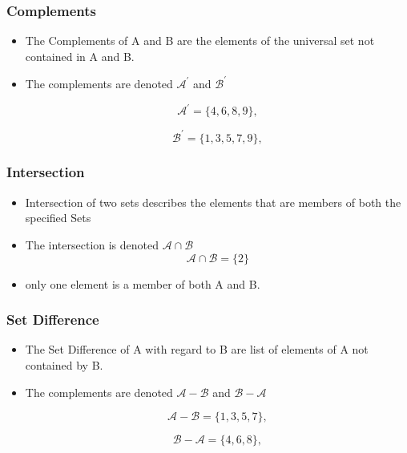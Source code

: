 \subsubsection*{Complements}

\begin{itemize}


\item The Complements of A and B are the elements of the universal set not contained in A and B.


\item The complements are denoted $\mathcal{A}^{\prime}$ and $\mathcal{B}^{\prime}$

\[ \mathcal{A}^{\prime} = \{4,6,8,9\}, \]


\[ \mathcal{B}^{\prime} = \{1,3,5,7,9\}, \]


\end{itemize}






\subsubsection*{Intersection}
\begin{itemize}


\item Intersection of two sets describes the elements that are members of both the specified Sets


\item The intersection is denoted $\mathcal{A\cap B}$ 
\[ \mathcal{A\cap B} = \{2\}\]


\item only one element is a member of both A and B.

\end{itemize}



\subsubsection*{Set Difference}

\begin{itemize}


\item The Set Difference of A with regard to B are list of elements of A not contained by B.


\item The complements are denoted $\mathcal{A-B}$ and $\mathcal{B-A}$

\[ \mathcal{A-B} = \{1,3,5,7\}, \]


\[ \mathcal{B-A} = \{4,6,8\}, \]

\end{itemize}

